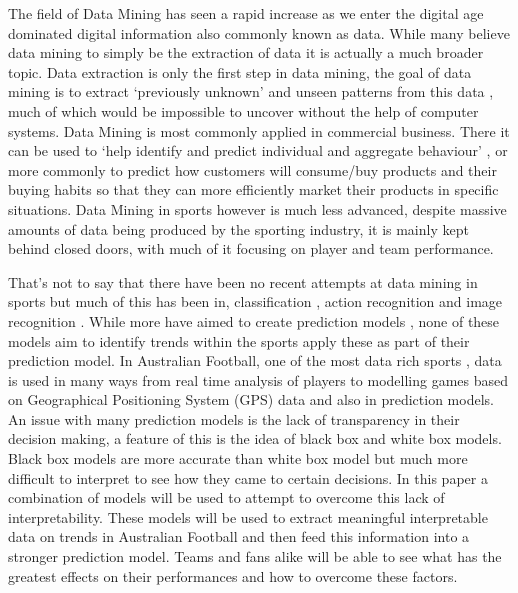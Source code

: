 \documentclass{imc-inf}
\begin{document}
	The field of Data Mining has seen a rapid increase as we enter the digital age dominated digital information also commonly known as data. While many believe data mining to simply be the extraction of data it is actually a much broader topic. Data extraction is only the first step in data mining, the goal of data mining is to extract ‘previously unknown’ and unseen patterns from this data \cite{website:TechGuy}, much of which would be impossible to uncover without the help of computer systems. Data Mining is most commonly applied in commercial business. There it can be used to ‘help identify and predict individual and aggregate behaviour’ \cite{ACM}, or more commonly to predict how customers will consume/buy products and their buying habits so that they can more efficiently market their products in specific situations. Data Mining in sports however is much less advanced, despite massive amounts of data being produced by the sporting industry, it is mainly kept behind closed doors, with much of it focusing on player and team performance.
	\linebreak
	
	That’s not to say that there have been no recent attempts at data mining in sports but much of this has been in, classification \cite{Displays}, action recognition \cite{AEJ} and image recognition \cite{Heliyon}. While more have aimed to create prediction models \cite{CollegeFootball}\cite{Basketball}\cite{LSTMPrediction}, none of these models aim to identify trends within the sports apply these as part of their prediction model. In Australian Football, one of the most data rich sports \cite{website:Vice}, data is used in many ways from real time analysis of players to modelling games based on Geographical Positioning System (GPS) data and also in prediction models. An issue with many prediction models is the lack of transparency in their decision making, a feature of this is the idea of black box and white box models. Black box models are more accurate than white box model but much more difficult to interpret to see how they came to certain decisions. In this paper a combination of models will be used to attempt to overcome this lack of interpretability. These models will be used to extract meaningful interpretable data on trends in Australian Football and then feed this information into a stronger prediction model. Teams and fans alike will be able to see what has the greatest effects on their performances and how to overcome these factors.\linebreak
	
\end{document}
